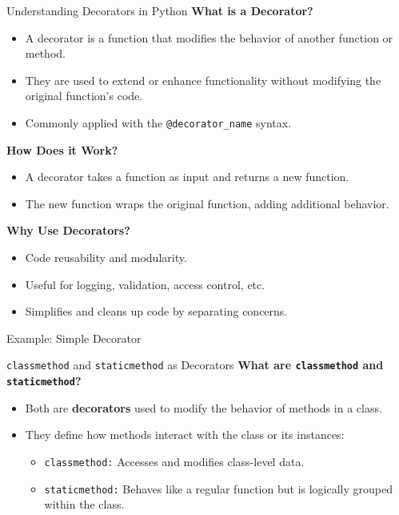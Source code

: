 \documentclass[10pt]{beamer}
\let\olditem\item
\renewcommand\item{\olditem\justifying}
\newcommand{\mypause}{\pause}
\begin{document}
	
	\begin{frame}{Understanding Decorators in Python}
		\textbf{What is a Decorator?}
		\begin{itemize}
			\item A decorator is a function that modifies the behavior of another function or method.
			\item They are used to extend or enhance functionality without modifying the original function's code.
			\item Commonly applied with the \texttt{@decorator\_name} syntax.
		\end{itemize}
		
		\textbf{How Does it Work?}
		\begin{itemize}
			\item A decorator takes a function as input and returns a new function.
			\item The new function wraps the original function, adding additional behavior.
		\end{itemize}
		
		\textbf{Why Use Decorators?}
		\begin{itemize}
			\item Code reusability and modularity.
			\item Useful for logging, validation, access control, etc.
			\item Simplifies and cleans up code by separating concerns.
		\end{itemize}
	\end{frame}
	
	
	\begin{frame}[fragile]{Example: Simple Decorator}
	
	
	\mypause
	
	
	
	\mypause
	
	
		
	\end{frame}
	
	\begin{frame}{\texttt{classmethod} and \texttt{staticmethod} as Decorators}
		\textbf{What are \texttt{classmethod} and \texttt{staticmethod}?}
		\begin{itemize}
			\item Both are \textbf{decorators} used to modify the behavior of methods in a class.
			\item They define how methods interact with the class or its instances:
			\begin{itemize}
				\item \texttt{classmethod:} Accesses and modifies class-level data.
				\item \texttt{staticmethod:} Behaves like a regular function but is logically grouped within the class.
			\end{itemize}
		\end{itemize}
	\end{frame}
		
\end{document}
